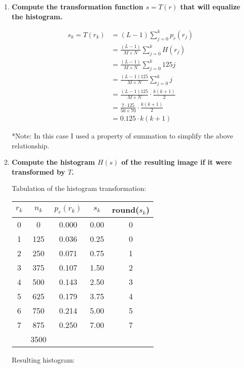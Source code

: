 \begin{enumerate}[font=\bfseries]
\begin{enumerate}[font=\bfseries, label=\alph*.]
	\item \textbf{Compute the transformation function $s=T(r)$ that will
	equalize the histogram.}

	\begin{align*}
	    s_k = T(r_k) &= (L-1)\sum_{j=0}^{k}p_r(r_j) \\
	    &= \frac{(L-1)}{M \times N}\sum_{j=0}^{k}H(r_j) \\
	    &= \frac{(L-1)}{M \times N}\sum_{j=0}^{k}125j \\
	    &= \frac{(L-1)125}{M \times N}\sum_{j=0}^{k}j \\
	    &= \frac{(L-1)125}{M \times N}\cdot\frac{k(k+1)}{2} \\
	    &= \frac{7\cdot125}{50 \times 70}\cdot\frac{k(k+1)}{2} \\
	    &= 0.125\cdot k(k+1)
	\end{align*}
	
	*Note: In this case I used a property of summation to simplify the above
	relationship.

	\item \textbf{Compute the histogram $H(s)$ of the resulting image if it
	were transformed by $T$.}
	
	Tabulation of the histogram transformation:

	\begin{table}[H]
	    \centering
	    \begin{tabular}{|c|c|c|c|c|} \hline
	    $r_k$ & $n_k$ & $p_r(r_k)$ & $s_k$ & round($s_k$) \\ \hline
	    0 & 0   & 0.000 & 0.00 & 0 \\ \hline
	    1 & 125 & 0.036 & 0.25 & 0 \\ \hline
	    2 & 250 & 0.071 & 0.75 & 1 \\ \hline
	    3 & 375 & 0.107 & 1.50 & 2 \\ \hline
	    4 & 500 & 0.143 & 2.50 & 3 \\ \hline
	    5 & 625 & 0.179 & 3.75 & 4 \\ \hline
	    6 & 750 & 0.214 & 5.00 & 5 \\ \hline
	    7 & 875 & 0.250 & 7.00 & 7 \\ \hline
	      & 3500 & & & \\ \hline
	    \end{tabular}
	\end{table}
	
	Resulting histogram:


\end{enumerate}
\end{enumerate}
